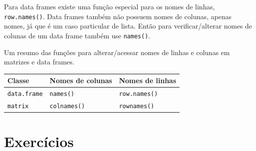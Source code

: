 \documentclass[10pt,a4paper]{book}
\newenvironment{Shaded}{\begin{snugshade}}{\end{snugshade}}
\newcommand{\KeywordTok}[1]{\textcolor[rgb]{0.13,0.29,0.53}{\textbf{#1}}}
\newcommand{\DecValTok}[1]{\textcolor[rgb]{0.00,0.00,0.81}{#1}}
\newcommand{\StringTok}[1]{\textcolor[rgb]{0.31,0.60,0.02}{#1}}
\newcommand{\OperatorTok}[1]{\textcolor[rgb]{0.81,0.36,0.00}{\textbf{#1}}}
\newcommand{\NormalTok}[1]{#1}
\begin{document}
Para data frames existe uma função especial para os nomes de linhas,
\texttt{row.names()}. Data frames também não possuem nomes de colunas,
apenas nomes, já que é um caso particular de lista. Então para
verificar/alterar nomes de colunas de um data frame também use
\texttt{names()}.

\begin{Shaded}
\end{Shaded}

Um resumo das funções para alterar/acessar nomes de linhas e colunas em
matrizes e data frames.

\begin{longtable}[]{@{}lll@{}}
\toprule
Classe & Nomes de colunas & Nomes de linhas\tabularnewline
\midrule
\endhead
\texttt{data.frame} & \texttt{names()} &
\texttt{row.names()}\tabularnewline
\texttt{matrix} & \texttt{colnames()} &
\texttt{rownames()}\tabularnewline
\bottomrule
\end{longtable}

\section*{Exercícios}\label{exercuxedcios-4}
\end{document}
